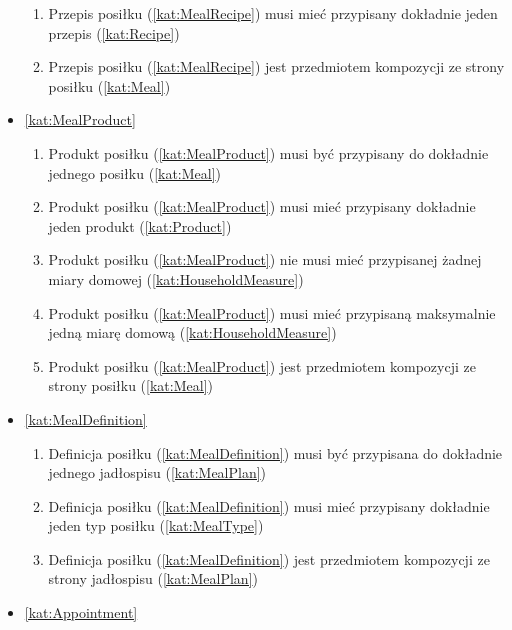 \begin{itemize}[label={\textbf{Reguły dla}}, wide, labelwidth=!, labelindent=0pt]
\begin{enumerate}[label={\textbf{REG/\protect\threedigits{\arabic{enumi}}}}, wide, labelwidth=!, align=left, leftmargin=3cm, resume]
        \item Przepis posiłku (\ref{kat:MealRecipe}) musi mieć przypisany dokładnie jeden przepis (\ref{kat:Recipe})
        \item Przepis posiłku (\ref{kat:MealRecipe}) jest przedmiotem kompozycji ze strony posiłku (\ref{kat:Meal})
    \end{enumerate}
    \item\ref{kat:MealProduct}
    \begin{enumerate}[label={\textbf{REG/\protect\threedigits{\arabic{enumi}}}}, wide, labelwidth=!, align=left, leftmargin=3cm, resume]
        \item Produkt posiłku (\ref{kat:MealProduct}) musi być przypisany do dokładnie jednego posiłku (\ref{kat:Meal})
        \item Produkt posiłku (\ref{kat:MealProduct}) musi mieć przypisany dokładnie jeden produkt (\ref{kat:Product})
        \item Produkt posiłku (\ref{kat:MealProduct}) nie musi mieć przypisanej żadnej miary domowej (\ref{kat:HouseholdMeasure})
        \item Produkt posiłku (\ref{kat:MealProduct}) musi mieć przypisaną maksymalnie jedną miarę domową (\ref{kat:HouseholdMeasure})
        \item Produkt posiłku (\ref{kat:MealProduct}) jest przedmiotem kompozycji ze strony posiłku (\ref{kat:Meal})
    \end{enumerate}
    \item\ref{kat:MealDefinition}
    \begin{enumerate}[label={\textbf{REG/\protect\threedigits{\arabic{enumi}}}}, wide, labelwidth=!, align=left, leftmargin=3cm, resume]
        \item Definicja posiłku (\ref{kat:MealDefinition}) musi być przypisana do dokładnie jednego jadłospisu (\ref{kat:MealPlan})
        \item Definicja posiłku (\ref{kat:MealDefinition}) musi mieć przypisany dokładnie jeden typ posiłku (\ref{kat:MealType})
        \item Definicja posiłku (\ref{kat:MealDefinition}) jest przedmiotem kompozycji ze strony jadłospisu (\ref{kat:MealPlan})
    \end{enumerate}
    \item\ref{kat:Appointment}
    \begin{enumerate}[label={\textbf{REG/\protect\threedigits{\arabic{enumi}}}}, wide, labelwidth=!, align=left, leftmargin=3cm, resume]

\end{enumerate}
\end{itemize}
